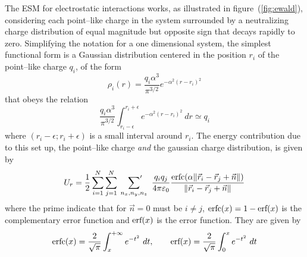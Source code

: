 The \ac{ESM} for electrostatic interactions works, as illustrated in figure~(\ref{fig:ewald}), considering each 
point--like charge in the system surrounded by a neutralizing charge distribution of equal magnitude but opposite 
sign that decays rapidly to zero. Simplifying the notation for a one dimensional system, the simplest functional 
form is a Gaussian distribution centered in the position $r_i$ of the point--like charge $q_i$, of the form
\begin{equation}
	\rho_i(r) = \frac{q_i\alpha^3}{\pi^{3/2}}e^{-\alpha^2 (r - r_i)^2}
\end{equation}
that obeys the relation
\begin{equation*}
	\frac{q_i\alpha^3}{\pi^{3/2}}\int_{r_i-\epsilon}^{r_i+\epsilon}e^{-\alpha^2 (r - r_i)^2}\ dr \simeq q_i
\end{equation*}
where $(r_i-\epsilon; r_i+\epsilon)$ is a small interval around $r_i$. The energy contribution due to this set 
up, the point--like charge \textit{and} the gaussian charge distribution, is given by
\begin{equation}
	U_r = \frac{1}{2}\sum_{i=1}^N\sum_{j=1}^N\ \sideset{}{'}\sum_{n_x,n_y,n_z}\ \frac{q_iq_j}{4 \pi \varepsilon_0} \frac{\erfc{(\alpha \| \vec r_i - \vec r_j + \vec n \|)}}{\| \vec r_i - \vec r_j + \vec n \|}
	\label{eq:ewaldReal}
\end{equation}
where the prime indicate that for $\vec n = 0$ must be $i\ne j$, $\text{erfc}(x) = 1-\text{erf}(x)$ is the complementary 
error function and $\text{erf}(x)$ is the error function. They are given by
\begin{equation}
	\text{erfc}(x) = \frac{2}{\sqrt{\pi}}\int_{x}^{+\infty} e^{-t^2}\ dt, \qquad \text{erf}(x) = \frac{2}{\sqrt{\pi}}\int_{0}^{x} e^{-t^2}\ dt
	\label{eq:erf}
\end{equation}

